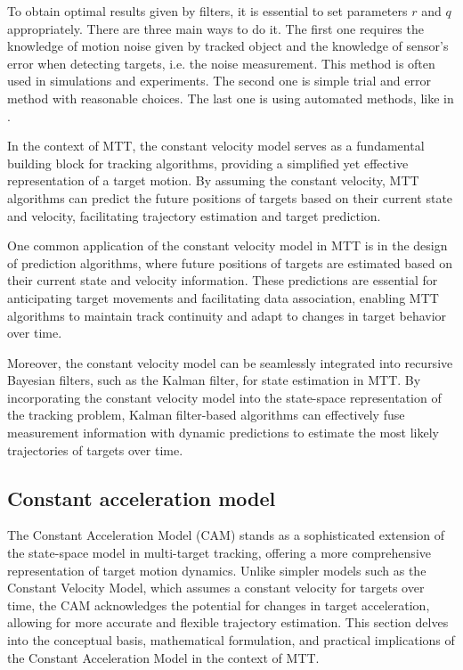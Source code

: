 To obtain optimal results given by filters, it is essential to set parameters $r$ and $q$ appropriately. There are
three main ways to do it. The first one requires the knowledge of motion noise given by tracked object and the
knowledge of sensor's error when detecting targets, i.e. the noise measurement. This method is often used in
simulations and experiments. The second one is simple trial
and error method with reasonable choices. The last one is using automated methods, like in \cite{BulutEastimation2011}.

In the context of MTT, the constant velocity model serves as a fundamental building block for tracking algorithms,
providing a simplified yet effective representation of a target motion. By assuming the constant velocity, MTT
algorithms
can predict the future positions of targets based on their current state and velocity, facilitating trajectory estimation and target prediction.

One common application of the constant velocity model in MTT is in the design of prediction algorithms, where future positions of targets are estimated based on their current state and velocity information. These predictions are essential for anticipating target movements and facilitating data association, enabling MTT algorithms to maintain track continuity and adapt to changes in target behavior over time.

Moreover, the constant velocity model can be seamlessly integrated into recursive Bayesian filters, such as the Kalman filter, for state estimation in MTT. By incorporating the constant velocity model into the state-space representation of the tracking problem, Kalman filter-based algorithms can effectively fuse measurement information with dynamic predictions to estimate the most likely trajectories of targets over time.
    \subsection{Constant acceleration model}
The Constant Acceleration Model (CAM) stands as a sophisticated extension of the state-space model in multi-target
tracking, offering a more comprehensive representation of target motion dynamics. Unlike simpler models such as the Constant Velocity Model, which assumes a constant velocity for targets over time, the CAM acknowledges the potential for changes in target acceleration, allowing for more accurate and flexible trajectory estimation. This section delves into the conceptual basis, mathematical formulation, and practical implications of the Constant Acceleration Model in the context of MTT.

